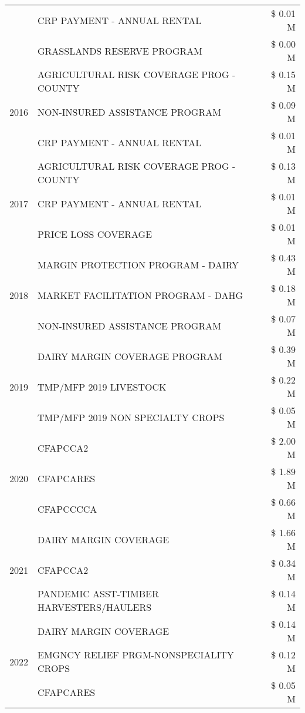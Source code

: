 \begin{tabular}{llr}
 & CRP PAYMENT - ANNUAL RENTAL & \$ 0.01 M \\
 & GRASSLANDS RESERVE PROGRAM & \$ 0.00 M \\
\cline{1-3}
\multirow[t]{3}{*}{2016} & AGRICULTURAL RISK COVERAGE PROG - COUNTY & \$ 0.15 M \\
 & NON-INSURED ASSISTANCE PROGRAM & \$ 0.09 M \\
 & CRP PAYMENT - ANNUAL RENTAL & \$ 0.01 M \\
\cline{1-3}
\multirow[t]{3}{*}{2017} & AGRICULTURAL RISK COVERAGE PROG - COUNTY & \$ 0.13 M \\
 & CRP PAYMENT - ANNUAL RENTAL & \$ 0.01 M \\
 & PRICE LOSS COVERAGE & \$ 0.01 M \\
\cline{1-3}
\multirow[t]{3}{*}{2018} & MARGIN PROTECTION PROGRAM - DAIRY & \$ 0.43 M \\
 & MARKET FACILITATION PROGRAM - DAHG & \$ 0.18 M \\
 & NON-INSURED ASSISTANCE PROGRAM & \$ 0.07 M \\
\cline{1-3}
\multirow[t]{3}{*}{2019} & DAIRY MARGIN COVERAGE PROGRAM & \$ 0.39 M \\
 & TMP/MFP 2019 LIVESTOCK & \$ 0.22 M \\
 & TMP/MFP 2019 NON SPECIALTY CROPS & \$ 0.05 M \\
\cline{1-3}
\multirow[t]{3}{*}{2020} & CFAPCCA2 & \$ 2.00 M \\
 & CFAPCARES & \$ 1.89 M \\
 & CFAPCCCCA & \$ 0.66 M \\
\cline{1-3}
\multirow[t]{3}{*}{2021} & DAIRY MARGIN COVERAGE & \$ 1.66 M \\
 & CFAPCCA2 & \$ 0.34 M \\
 & PANDEMIC ASST-TIMBER HARVESTERS/HAULERS & \$ 0.14 M \\
\cline{1-3}
\multirow[t]{3}{*}{2022} & DAIRY MARGIN COVERAGE & \$ 0.14 M \\
 & EMGNCY RELIEF PRGM-NONSPECIALITY CROPS & \$ 0.12 M \\
 & CFAPCARES & \$ 0.05 M \\
\cline{1-3}
\bottomrule
\end{tabular}
